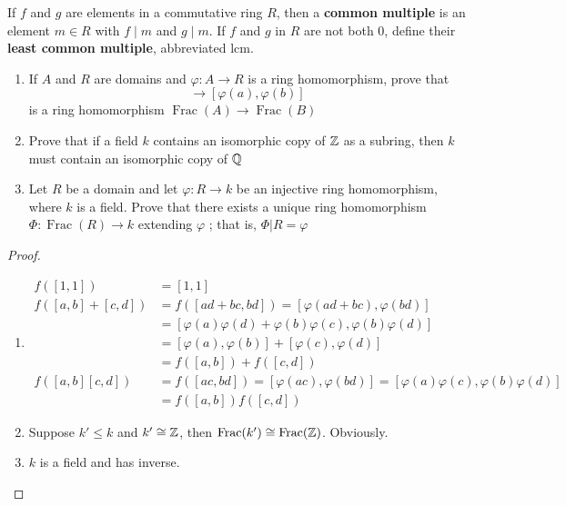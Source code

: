 \documentclass[11pt]{article}
\DeclareMathOperator{\Frac}{Frac}
\begin{document}
\begin{definition}[]
If \(f\) and \(g\) are elements in a commutative ring \(R\), then a \textbf{common multiple}
is an element \(m\in R\) with \(f\mid m\) and \(g\mid m\). If \(f\) and \(g\) in
\(R\) are not both 0, define their \textbf{least common multiple}, abbreviated lcm.
\end{definition}

\begin{exercise}
\label{ex3.47}
\begin{enumerate}
\item If \(A\) and \(R\) are domains and \(\varphi:A\to R\) is a ring homomorphism,
prove that 
\begin{equation*}
[a,b]\to [\varphi(a),\varphi(b)]
\end{equation*}
is a ring homomorphism \(\Frac(A)\to\Frac(B)\)
\item Prove that if a field \(k\) contains an isomorphic copy of \(\mathbb{Z}\) as a
subring, then \(k\) must contain an isomorphic copy of \(\mathbb{Q}\)
\item Let \(R\) be a domain and let \(\varphi:R\to k\) be an injective ring
homomorphism, where \(k\) is a field. Prove that there exists a unique ring
homomorphism \(\Phi:\Frac(R)\to k\) extending \(\varphi\) ; that is, \(\Phi|R=\varphi\)
\end{enumerate}
\end{exercise}

\begin{proof}
\begin{enumerate}
\item \begin{align*}
f([1,1])&=[1,1]\\
f([a,b]+[c,d])&=f([ad+bc,bd])=[\varphi(ad+bc),\varphi(bd)]\\
&=[\varphi(a)\varphi(d)+\varphi(b)\varphi(c),\varphi(b)\varphi(d)]\\
&=[\varphi(a),\varphi(b)]+[\varphi(c),\varphi(d)]\\
&=f([a,b])+f([c,d])\\
f([a,b][c,d])&=f([ac,bd])=[\varphi(ac),\varphi(bd)]=[\varphi(a)\varphi(c),
\varphi(b)\varphi(d)]\\&=f([a,b])f([c,d])
\end{align*}
\item Suppose \(k'\le k\) and \(k'\cong\mathbb{Z}\), then \(\Frac(k')\cong\Frac(\Z)\).
Obviously.
\item \(k\) is a field and has inverse.
\end{enumerate}
\end{proof}
\end{document}
